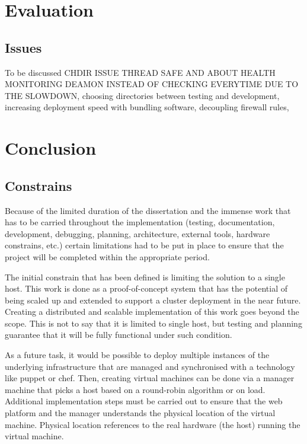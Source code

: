\documentclass{article}
\begin{document}
\newpage
\section{Evaluation}

\subsection{Issues}
{\color{red} 
	To be discussed CHDIR ISSUE THREAD SAFE AND ABOUT HEALTH MONITORING DEAMON INSTEAD OF CHECKING EVERYTIME DUE TO THE SLOWDOWN, choosing directories between testing and development, increasing deployment speed with bundling software, decoupling firewall rules,  
}

\newpage
\section{Conclusion}

\subsection{Constrains}
Because of the limited duration of the dissertation and the immense work that has to be carried throughout the implementation (testing, documentation, development, debugging, planning, architecture, external tools, hardware constrains, etc.) certain limitations had to be put in place to ensure that the project will be completed within the appropriate period.

The initial constrain that has been defined is limiting the solution to a single host. This work is done as a proof-of-concept system that has the potential of being scaled up and extended to support a cluster deployment in the near future.
Creating a distributed and scalable implementation of this work goes beyond the scope. This is not to say that it is limited to single host, but testing and planning guarantee that it will be fully functional under such condition.

As a future task, it would be possible to deploy multiple instances of the underlying infrastructure that are managed and synchronised with a technology like puppet or chef. Then, creating virtual machines can be done via a manager machine that picks a host based on a round-robin algorithm or on load. Additional implementation steps must be carried out to ensure that the web platform and the manager understands the physical location of the virtual machine. Physical location references to the real hardware (the host) running the virtual machine.
\end{document}
